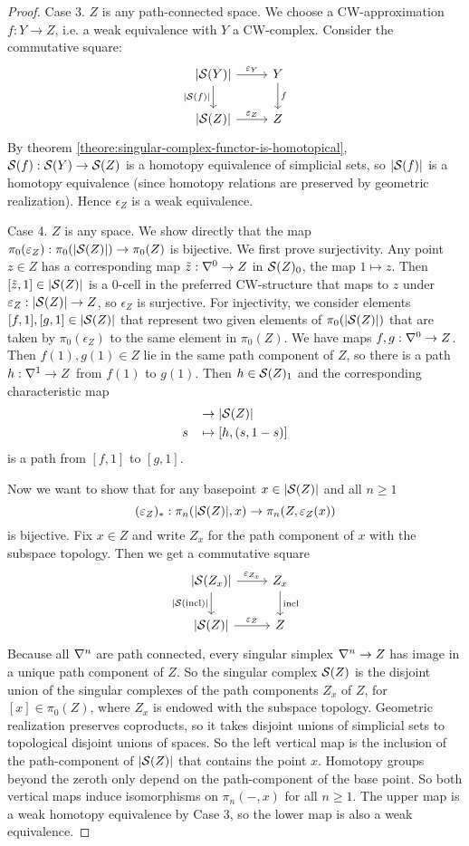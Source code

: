 \begin{proof}
Case 3. $Z$ is any path-connected space. We choose a CW-approximation $f:Y\to Z$, i.e. a weak equivalence with $Y$ a CW-complex. Consider the commutative square:
\[
\begin{tikzcd}
{|\S(Y)|} \ar[d,"{|\S(f)|}"'] \ar[r,"\epsilon_{Y}"] & Y \ar[d,"f"]\\
{|\S(Z)|} \ar[r,"\epsilon_Z"] & Z
\end{tikzcd}
\]
By theorem \ref{theore:singular-complex-functor-is-homotopical}, $\S(f):\S(Y)\to\S(Z)$ is a homotopy equivalence of simplicial sets, so $|\S(f)|$ is a homotopy equivalence (since homotopy relations are preserved by geometric realization). Hence $\epsilon_Z$ is a weak equivalence.

Case 4. $Z$ is any space. We show directly that the map $\pi_0(\epsilon_Z):\pi_0(|\S(Z)|)\to\pi_0(Z)$ is bijective. We first prove surjectivity. Any point $z\in Z$ has a corresponding map $\til z:\sx{0}\to Z$ in $\S(Z)_0$, the map $1\mapsto z$. Then $[\til z,1]\in |\S(Z)|$ is a $0$-cell in the preferred CW-structure that maps to $z$ under $\epsilon_Z:|\S(Z)|\to Z$, so $\epsilon_Z$ is surjective. For injectivity, we consider elements $[f,1],[g,1]\in|\S(Z)|$ that represent two given elements of $\pi_0(|\S(Z)|)$ that are taken by $\pi_0(\epsilon_Z)$ to the same element in $\pi_0(Z)$. We have maps $f,g:\sx{0}\to Z$. Then $f(1),g(1)\in Z$ lie in the same path component of $Z$, so there is a path $h:\sx{1}\to Z$ from $f(1)$ to $g(1)$. Then $h\in\S(Z)_1$ and the corresponding characteristic map
\begin{align*}
[0,1]&\to|\S(Z)|\\
s\ \ \,&\mapsto[h,(s,1-s)]
\end{align*}
is a path from $[f,1]$ to $[g,1]$.

Now we want to show that for any basepoint $x\in|\S(Z)|$ and all $n\ge1$
\[(\epsilon_Z)_*:\pi_n(|\S(Z)|,x)\to\pi_n(Z,\epsilon_Z(x))\]
is bijective. Fix $x\in Z$ and write $Z_x$ for the path component of $x$ with the subspace topology. Then we get a commutative square
\[
\begin{tikzcd}
{|\S(Z_x)|} \ar[d,"{|\S(\incl)|}"'] \ar[r,"\epsilon_{Z_x}"] & Z_x \ar[d,"\incl"]\\
{|\S(Z)|} \ar[r,"\epsilon_Z"] & Z
\end{tikzcd}
\]
Because all $\ns$ are path connected, every singular simplex $\ns\to Z$ has image in a unique path component of $Z$. So the singular complex $\S(Z)$ is the disjoint union of the singular complexes of the path components $Z_x$ of $Z$, for $[x]\in\pi_0(Z)$, where $Z_x$ is endowed with the subspace topology. Geometric realization preserves coproducts, so it takes disjoint unions of simplicial sets to topological disjoint unions of spaces. So the left vertical map is the inclusion of the path-component of $|\S(Z)|$ that contains the point $x$. Homotopy groups beyond the zeroth only depend on the path-component of the base point. So both vertical maps induce isomorphisms on $\pi_n(-,x)$ for all $n\ge1$. The upper map is a weak homotopy equivalence by Case 3, so the lower map is also a weak equivalence.
\end{proof}
